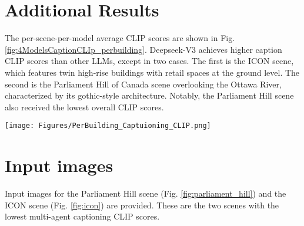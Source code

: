 \newpage
\appendix %

\renewcommand{\thefigure}{A\arabic{figure}} %
\renewcommand{\thetable}{A\arabic{table}}   %
\setcounter{figure}{0}  %
\setcounter{table}{0}   %

\section*{Additional Results}
The per-scene-per-model average CLIP scores are shown in Fig. \ref{fig:4ModelsCaptionCLIp_perbuilding}. Deepseek-V3 achieves higher caption CLIP scores than other LLMs, except in two cases. The first is the ICON scene, which features twin high-rise buildings with retail spaces at the ground level. The second is the Parliament Hill of Canada scene overlooking the Ottawa River, characterized by its gothic-style architecture. Notably, the Parliament Hill scene also received the lowest overall CLIP scores.


\begin{figure*}[htpb]
\centering
\texttt{[image: Figures/PerBuilding\_Captuioning\_CLIP.png]}
\caption{Average CLIP score of each building image captioning model for each different scene.}\label{fig:4ModelsCaptionCLIp_perbuilding}
\end{figure*}

\section*{Input images}
Input images for the Parliament Hill scene (Fig. \ref{fig:parliament_hill}) and the ICON scene (Fig. \ref{fig:icon}) are provided. These are the two scenes with the lowest multi-agent captioning CLIP scores. 


